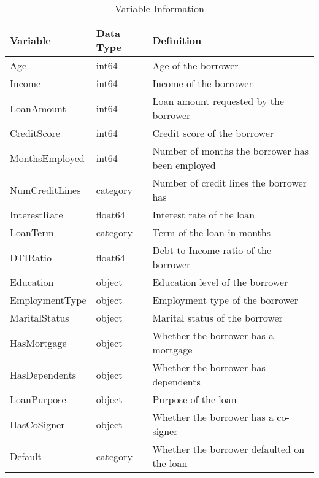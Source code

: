 \begin{table}[H]\centering
\caption{Variable Information}
\label{Table 1:variable_info}
\begin{tabular}{lll}
\toprule
Variable & Data Type & Definition \\
\midrule
Age & int64 & Age of the borrower \\
Income & int64 & Income of the borrower \\
LoanAmount & int64 & Loan amount requested by the borrower \\
CreditScore & int64 & Credit score of the borrower \\
MonthsEmployed & int64 & Number of months the borrower has been employed \\
NumCreditLines & category & Number of credit lines the borrower has \\
InterestRate & float64 & Interest rate of the loan \\
LoanTerm & category & Term of the loan in months \\
DTIRatio & float64 & Debt-to-Income ratio of the borrower \\
Education & object & Education level of the borrower \\
EmploymentType & object & Employment type of the borrower \\
MaritalStatus & object & Marital status of the borrower \\
HasMortgage & object & Whether the borrower has a mortgage \\
HasDependents & object & Whether the borrower has dependents \\
LoanPurpose & object & Purpose of the loan \\
HasCoSigner & object & Whether the borrower has a co-signer \\
Default & category & Whether the borrower defaulted on the loan \\
\bottomrule
\end{tabular}
\end{table}
